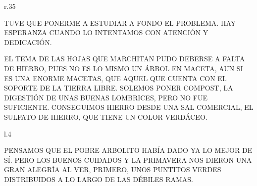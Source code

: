 \newpage
{}
\begin{wrapfigure}[12]{r}{.35\textwidth}\vspace{-1.2cm}
\end{wrapfigure}
TUVE QUE PONERME A ESTUDIAR A FONDO EL PROBLEMA. HAY ESPERANZA CUANDO LO INTENTAMOS CON ATENCIÓN Y DEDICACIÓN.

EL TEMA DE LAS HOJAS QUE MARCHITAN PUDO DEBERSE A FALTA DE HIERRO, PUES NO ES LO MISMO UN ÁRBOL EN MACETA, AUN SI ES UNA ENORME MACETAS, QUE AQUEL QUE CUENTA CON EL SOPORTE DE LA TIERRA LIBRE. SOLEMOS PONER COMPOST, LA DIGESTIÓN DE UNAS BUENAS LOMBRICES, PERO NO FUE SUFICIENTE. CONSEGUIMOS HIERRO DESDE UNA SAL COMERCIAL, EL SULFATO DE HIERRO, QUE TIENE UN COLOR VERDÁCEO. 

\newpage
{}
\begin{wrapfigure}[13]{l}{.4\textwidth}\vspace{-2cm}
\end{wrapfigure}
PENSAMOS QUE EL POBRE ARBOLITO HABÍA DADO YA LO MEJOR DE SÍ. PERO LOS BUENOS CUIDADOS Y LA PRIMAVERA NOS DIERON UNA GRAN ALEGRÍA AL VER, PRIMERO, UNOS PUNTITOS VERDES DISTRIBUIDOS A LO LARGO DE LAS DÉBILES RAMAS.

